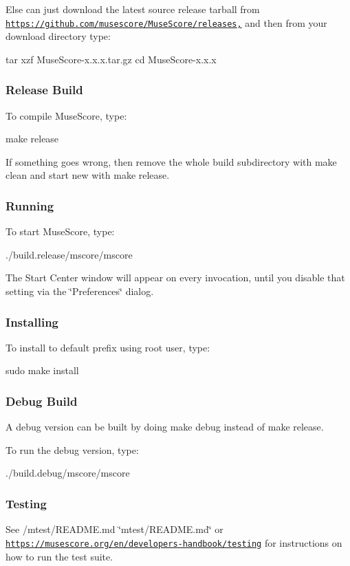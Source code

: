 Else can just download the latest source release tarball from \href{https://github.com/musescore/MuseScore/releases,}{\tt https\+://github.\+com/musescore/\+Muse\+Score/releases,} and then from your download directory type\+: \begin{DoxyVerb}tar xzf MuseScore-x.x.x.tar.gz
cd MuseScore-x.x.x
\end{DoxyVerb}


\subsubsection*{Release Build}

To compile Muse\+Score, type\+: \begin{DoxyVerb}make release
\end{DoxyVerb}


If something goes wrong, then remove the whole build subdirectory with {\ttfamily make clean} and start new with {\ttfamily make release}.

\subsubsection*{Running}

To start Muse\+Score, type\+: \begin{DoxyVerb}./build.release/mscore/mscore
\end{DoxyVerb}


The Start Center window will appear on every invocation, until you disable that setting via the \char`\"{}\+Preferences\char`\"{} dialog.

\subsubsection*{Installing}

To install to default prefix using root user, type\+: \begin{DoxyVerb}sudo make install
\end{DoxyVerb}


\subsubsection*{Debug Build}

A debug version can be built by doing {\ttfamily make debug} instead of {\ttfamily make release}.

To run the debug version, type\+: \begin{DoxyVerb}./build.debug/mscore/mscore
\end{DoxyVerb}


\subsubsection*{Testing}

See /mtest/\+R\+E\+A\+D\+ME.md \char`\"{}mtest/\+R\+E\+A\+D\+M\+E.\+md\char`\"{} or \href{https://musescore.org/en/developers-handbook/testing}{\tt https\+://musescore.\+org/en/developers-\/handbook/testing} for instructions on how to run the test suite. 